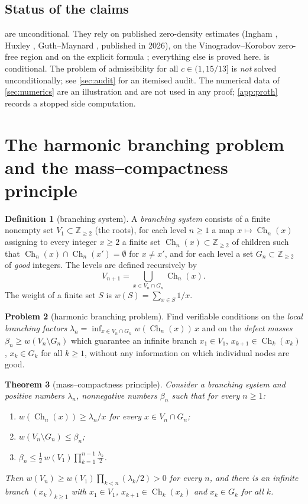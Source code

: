 \documentclass[11pt,a4paper]{article}
\newtheorem{theorem}{Theorem}[section]
\theoremstyle{definition}
\newtheorem{definition}[theorem]{Definition}
\newtheorem{problem}[theorem]{Problem}
\newcommand{\Z}{\mathbb{Z}}
\newcommand{\Ch}{\operatorname{Ch}}
\begin{document}
\subsection{Status of the claims}
 are unconditional. They rely on published zero-density estimates
(Ingham \cite{Ing40}, Huxley \cite{Hux72}, Guth--Maynard \cite{GM24}, published in 2026), on the Vinogradov--Korobov zero-free
region \cite{Ivi85,For02} and on the explicit formula \cite{Dav00}; everything else is proved here.
 is conditional. The problem of admissibility for all $c\in(1,15/13]$ is \emph{not}
solved unconditionally; see \cref{sec:audit} for an itemised audit. The numerical data of
\cref{sec:numerics} are an illustration and are not used in any proof; \cref{app:proth} records a stopped
side computation.

\section{The harmonic branching problem and the mass--compactness principle}\label{sec:mass}

\begin{definition}[branching system]\label{def:branching}
A \emph{branching system} consists of a finite nonempty set $V_1\subset\Z_{\ge2}$ (the roots), for each
level $n\ge1$ a map $x\mapsto\Ch_n(x)$ assigning to every integer $x\ge2$ a finite set
$\Ch_n(x)\subset\Z_{\ge2}$ of children such that $\Ch_n(x)\cap\Ch_n(x')=\emptyset$ for $x\neq x'$, and for
each level a set $G_n\subset\Z_{\ge2}$ of \emph{good} integers. The levels are defined recursively by
\[
 V_{n+1}=\bigcup_{x\in V_n\cap G_n}\Ch_n(x).
\]
The weight of a finite set $S$ is $w(S)=\sum_{x\in S}1/x$.
\end{definition}

\begin{problem}[harmonic branching problem]\label{prob:H}
Find verifiable conditions on the \emph{local branching factors}
$\lambda_n=\inf_{x\in V_n\cap G_n} w(\Ch_n(x))\,x$ and on the \emph{defect masses}
$\beta_n\ge w(V_n\setminus G_n)$ which guarantee an infinite branch $x_1\in V_1$, $x_{k+1}\in\Ch_k(x_k)$,
$x_k\in G_k$ for all $k\ge1$, without any information on which individual nodes are good.
\end{problem}

\begin{theorem}[mass--compactness principle]\label{thm:mass}
Consider a branching system and positive numbers $\lambda_n$, nonnegative numbers $\beta_n$ such that
for every $n\ge1$:
\begin{enumerate}[label=\textup{(\roman*)}]
 \item $w(\Ch_n(x))\ge\lambda_n/x$ for every $x\in V_n\cap G_n$;
 \item $w(V_n\setminus G_n)\le\beta_n$;
 \item $\displaystyle \beta_n\le\frac12\,w(V_1)\prod_{k=1}^{n-1}\frac{\lambda_k}{2}$.
\end{enumerate}
Then $w(V_n)\ge w(V_1)\prod_{k<n}(\lambda_k/2)>0$ for every $n$, and there is an infinite branch
$(x_k)_{k\ge1}$ with $x_1\in V_1$, $x_{k+1}\in\Ch_k(x_k)$ and $x_k\in G_k$ for all $k$.
\end{theorem}
\end{document}
